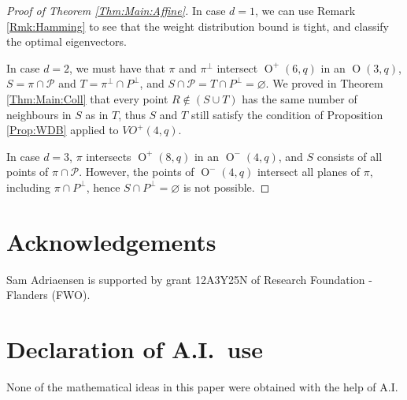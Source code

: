 \documentclass[a4paper]{article}
\theoremstyle{definition}
\renewcommand{\mp}{\mathcal P}
\DeclareMathOperator{\OO}{O}
\begin{document}
\begin{proof}[Proof of Theorem \ref{Thm:Main:Affine}]
In case $d=1$, we can use Remark \ref{Rmk:Hamming} to see that the weight distribution bound is tight, and classify the optimal eigenvectors.

In case $d=2$, we must have that $\pi$ and $\pi^\perp$ intersect $\OO^+(6,q)$ in an $\OO(3,q)$, $S = \pi \cap \mp$ and $T = \pi^\perp \cap P^\perp$, and $S \cap \mp = T \cap P^\perp = \varnothing$.
We proved in Theorem \ref{Thm:Main:Coll} that every point $R \notin (S \cup T)$ has the same number of neighbours in $S$ as in $T$, thus $S$ and $T$ still satisfy the condition of Proposition \ref{Prop:WDB} applied to $VO^+(4,q)$.

In case $d=3$, $\pi$ intersects $\OO^+(8,q)$ in an $\OO^-(4,q)$, and $S$ consists of all points of $\pi \cap \mp$.
However, the points of $\OO^-(4,q)$ intersect all planes of $\pi$, including $\pi \cap P^\perp$, hence $S \cap P^\perp = \varnothing$ is not possible.
\end{proof}

\section*{Acknowledgements}

Sam Adriaensen is supported by grant 12A3Y25N of Research Foundation - Flanders (FWO).

\section*{Declaration of A.I.\ use}

None of the mathematical ideas in this paper were obtained with the help of A.I.



\end{document}
